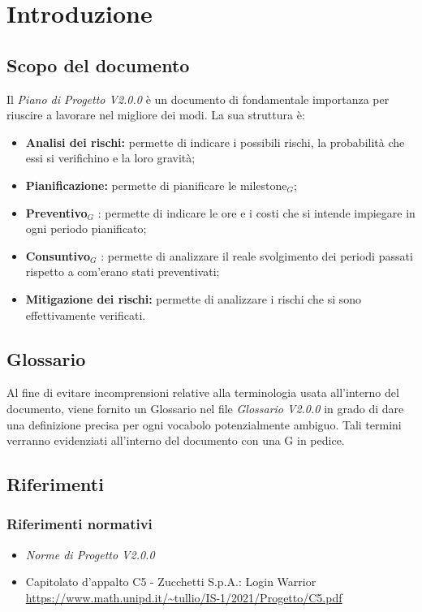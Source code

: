 \chapter{Introduzione}

\section{Scopo del documento}

Il \textit{Piano di Progetto V2.0.0} è un documento di fondamentale importanza per riuscire a lavorare nel migliore dei
modi. La sua struttura è:
\begin{itemize}
    \item \textbf{Analisi dei rischi: } permette di indicare i possibili rischi, la probabilità che essi si verifichino e la loro gravità;
    \item \textbf{Pianificazione: } permette di pianificare le milestone$_G$;
    \item \textbf{Preventivo}$_G$ : permette di indicare le ore e i costi che si intende impiegare in ogni periodo pianificato;
    \item \textbf{Consuntivo}$_G$ : permette di analizzare il reale svolgimento dei periodi passati rispetto a com'erano stati preventivati;
    \item \textbf{Mitigazione dei rischi: } permette di analizzare i rischi che si sono effettivamente verificati.
\end{itemize}

\section{Glossario}
Al fine di evitare incomprensioni relative alla terminologia usata all'interno del documento, viene fornito un Glossario nel file \textit{Glossario V2.0.0} in grado di dare una definizione precisa per ogni vocabolo potenzialmente ambiguo. Tali termini verranno evidenziati all'interno del documento con una G in pedice.

\section{Riferimenti}
\subsection{Riferimenti normativi}
\begin{itemize}
  \item \textit{Norme di Progetto V2.0.0}
  \item Capitolato d'appalto C5 - Zucchetti S.p.A.: Login Warrior \\
  \url{https://www.math.unipd.it/~tullio/IS-1/2021/Progetto/C5.pdf}
\end{itemize}


